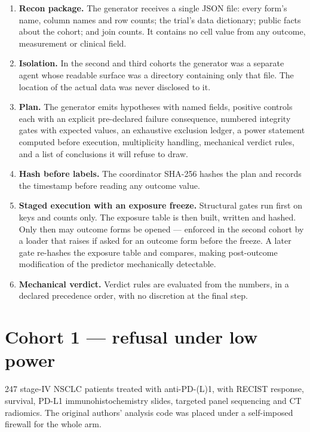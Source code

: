 \documentclass[11pt,a4paper]{article}
\begin{document}
\begin{enumerate}[leftmargin=1.4em,itemsep=3pt]
\item \textbf{Recon package.} The generator receives a single JSON file: every form's name, column
      names and row counts; the trial's data dictionary; public facts about the cohort; and
      join counts. It contains no cell value from any outcome, measurement or clinical field.
\item \textbf{Isolation.} In the second and third cohorts the generator was a separate agent whose
      readable surface was a directory containing only that file. The location of the actual data was never
      disclosed to it.
\item \textbf{Plan.} The generator emits hypotheses with named fields, positive controls each with
      an explicit pre-declared failure consequence, numbered integrity gates with expected values,
      an exhaustive exclusion ledger, a power statement computed before execution, multiplicity
      handling, mechanical verdict rules, and a list of conclusions it will refuse to draw.
\item \textbf{Hash before labels.} The coordinator SHA-256 hashes the plan and records the
      timestamp before reading any outcome value.
\item \textbf{Staged execution with an exposure freeze.} Structural gates run first on keys and
      counts only. The exposure table is then built, written and hashed. Only then may outcome
      forms be opened --- enforced in the second cohort by a loader that raises if asked for an
      outcome form before the freeze. A later gate re-hashes the exposure table and compares,
      making post-outcome modification of the predictor mechanically detectable.
\item \textbf{Mechanical verdict.} Verdict rules are evaluated from the numbers, in a declared
      precedence order, with no discretion at the final step.
\end{enumerate}

\section{Cohort 1 --- refusal under low power}

247 stage-IV NSCLC patients treated with anti-PD-(L)1, with RECIST response, survival, PD-L1
immunohistochemistry slides, targeted panel sequencing and CT radiomics. The original authors'
analysis code was placed under a self-imposed firewall for the whole arm.
\end{document}
